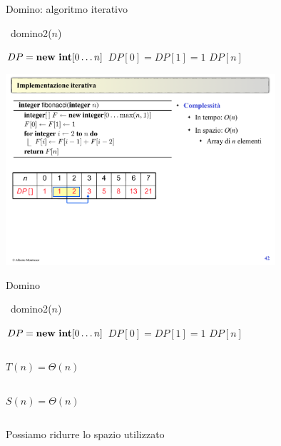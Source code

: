 \begin{frame}[fragile]{Domino: algoritmo iterativo}

\vspace{-9pt}

\begin{Procedure}
\caption[A]{\INTEGER\ \textsf{domino2}(\INTEGER $n$)}
  $DP = \NEW\ \INTEGER[0 \ldots n]$\;
  $DP[0] = DP[1] = 1$\;
  \Return $DP[n]$\;
\end{Procedure}

\begin{center}
\includegraphics[width=0.75\textwidth]{fib-table1.pdf}
\end{center}

\end{frame}



\begin{frame}[fragile]{Domino}

\begin{Procedure}
\caption[A]{\INTEGER\  \textsf{domino2}(\INTEGER $n$)}
  $DP = \NEW\ \INTEGER[0 \ldots n]$\;
  $DP[0] = DP[1] = 1$\;
  \Return $DP[n]$\;
\end{Procedure}

\begin{columns}[T]
\pause
{}
\bigskip
\alert{$T(n) = \Theta(n)$}
\end{columns}

\begin{columns}[T]
\pause
{}
\bigskip
\alert{$S(n) = \Theta(n)$}
\end{columns}

\begin{columns}[T]
\pause
{}
\bigskip
\alert{Possiamo ridurre lo spazio utilizzato}
\end{columns}

\end{frame}

